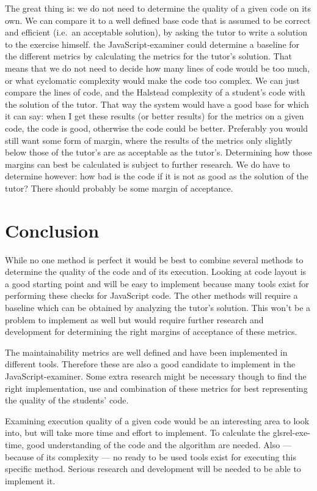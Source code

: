 The great thing is: we do not need to determine the quality of a given code
on its own. We can compare it to a well defined base code that is assumed to be
correct and efficient (i.e.\ an acceptable solution),
by asking the tutor to write a solution to the exercise himself.
the JavaScript-examiner could determine a baseline for the different metrics
by calculating the metrics for the tutor's solution.
That means that we do not
need to decide how many lines of code would be too much, or what cyclomatic
complexity would make the code too complex. We can just compare the lines of
code, and the Halstead complexity of a student's code with the solution of the
tutor.
That way the system would have a good base for which it can say:
when I get these results (or better results) for the metrics on a given
code, the code is good, otherwise the code could be better. Preferably you
would still want some form of margin, where the results of the metrics only
slightly below those of the tutor's are as acceptable as the
tutor's. Determining how those margins can best be calculated is subject to
further research.
We do have to determine however: how bad is the code if it is not as
good as the solution of the tutor? There should probably be some margin of
acceptance.


\section{Conclusion}

While no one method is perfect it would be best to combine several methods to
determine the quality of the code and of its execution. Looking at code layout
is a good starting point and will be easy to implement because many tools exist
for performing these checks for JavaScript code. The other methods will require
a baseline which can be obtained by analyzing the tutor's solution. This won't
be a problem to implement as well but would require further research and
development for determining the right margins of acceptance of these metrics.

The maintainability metrics are well defined and have been implemented in
different tools. Therefore these are also a good candidate to implement in
the JavaScript-examiner. Some extra research might be necessary though to find
the right implementation, use and combination of these metrics for best
representing the quality of the students' code.

Examining execution quality of a given code would be an interesting area to
look into, but will take more time and effort to implement. To calculate the
gls{rel-exe-time}, good understanding of the code and the algorithm are
needed. Also --- because of its complexity --- no ready to be used tools exist
for executing this specific method. Serious research and development will be
needed to be able to implement it.

